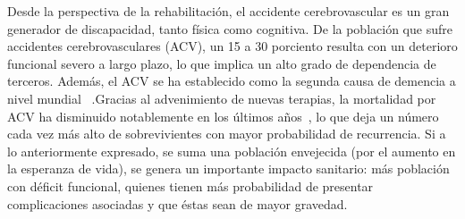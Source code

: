 \begin{introduction}
    Desde la perspectiva de la rehabilitación, el accidente cerebrovascular es un gran generador de discapacidad, tanto física como cognitiva. De la población que sufre accidentes cerebrovasculares (ACV), un 15 a 30 porciento resulta con un deterioro funcional severo a largo plazo, lo que implica un alto grado de dependencia de terceros. Además, el ACV se ha establecido como la segunda causa de demencia a nivel mundial~\cite{moyano2010accidente} .Gracias al advenimiento de nuevas terapias, la mortalidad por ACV ha disminuido notablemente en los últimos años~\cite{cuadrado2009rehabilitacion,harold2007guidelines}, lo que deja un número cada vez más alto de sobrevivientes con mayor probabilidad de recurrencia. Si a lo anteriormente expresado, se suma una población envejecida (por el aumento en la esperanza de vida), se genera un importante impacto sanitario: más población con déficit funcional, quienes tienen más probabilidad de presentar complicaciones asociadas y que éstas sean de mayor gravedad.


\end{introduction}
